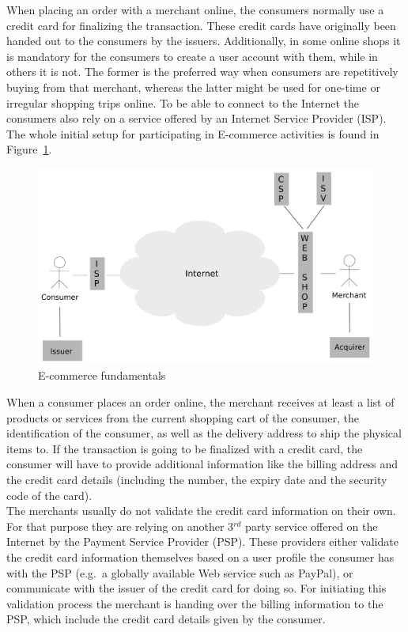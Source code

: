 When placing an order with a merchant online, the consumers normally use a credit card for finalizing the transaction. These credit cards have originally been handed out to the consumers by the issuers. Additionally, in some online shops it is mandatory for the consumers to create a user account with them, while in others it is not. The former is the preferred way when consumers are repetitively buying from that merchant, whereas the latter might be used for one-time or irregular shopping trips online. To be able to connect to the Internet the consumers also rely on a service offered by an Internet Service Provider (\gls{ISP}). The whole initial setup for participating in \gls{E-commerce} activities is found in Figure~\ref{fig:images_ecommerce_scenario}.\@

\begin{figure}[H]
	\centering
		\includegraphics[width=0.9\columnwidth]{images/e-commerce-scenario.pdf}
	\caption{\gls{E-commerce} fundamentals}
\label{fig:images_ecommerce_scenario}
\end{figure}

When a consumer places an order online, the merchant receives at least a list of products or services from the current shopping cart of the consumer, the identification of the consumer, as well as the delivery address to ship the physical items to. If the transaction is going to be finalized with a credit card, the consumer will have to provide additional information like the billing address and the credit card details (including the number, the expiry date and the security code of the card). \\

The merchants usually do not validate the credit card information on their own. For that purpose they are relying on another 3$^{rd}$ party service offered on the Internet by the Payment Service Provider (\gls{PSP}). These providers either validate the credit card information themselves based on a user profile the consumer has with the \gls{PSP} (e.g.\ a globally available Web service such as PayPal), or communicate with the issuer of the credit card for doing so. For initiating this validation process the merchant is handing over the billing information to the \gls{PSP}, which include the credit card details given by the consumer. \\

